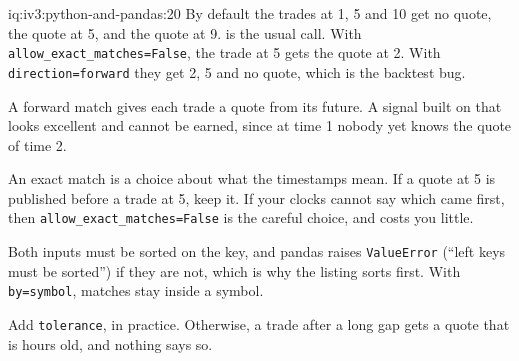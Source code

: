 \begin{solution}{iq:iv3:python-and-pandas:20}
By default the trades at 1, 5 and 10 get no quote, the quote at 5, and the quote at 9.  is the usual call. With \texttt{allow\_exact\_matches=False}, the trade at 5 gets the quote at 2. With \texttt{direction=\textquotesingle forward\textquotesingle} they get 2, 5 and no quote, which is the backtest bug.
\label{lst:iv3:pp:asof}

A forward match gives each trade a quote from its future. A signal built on that looks excellent and cannot be earned, since at time 1 nobody yet knows the quote of time 2.

An exact match is a choice about what the timestamps mean. If a quote at 5 is published before a trade at 5, keep it. If your clocks cannot say which came first, then \texttt{allow\_exact\_matches=False} is the careful choice, and costs you little.

Both inputs must be sorted on the key, and pandas raises \texttt{ValueError} (``left keys must be sorted'') if they are not, which is why the listing sorts first. With \texttt{by=\textquotesingle symbol\textquotesingle}, matches stay inside a symbol.

Add \texttt{tolerance}, in practice. Otherwise, a trade after a long gap gets a quote that is hours old, and nothing says so.

\end{solution}

